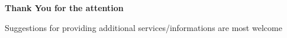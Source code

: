\documentclass[t]{beamer}
\begin{document}
\begin{frame}[c]
    \centering
    \textbf{\Large Thank You for the attention}

    Suggestions for providing additional services/informations are most welcome
\end{frame}
\end{document}
